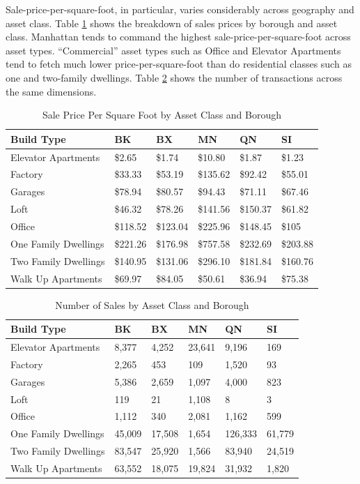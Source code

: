\documentclass[conference,final,]{IEEEtran}
\begin{document}
Sale-price-per-square-foot, in particular, varies considerably across
geography and asset class. Table \ref{tab:by_class_boro} shows the
breakdown of sales prices by borough and asset class. Manhattan tends to
command the highest sale-price-per-square-foot across asset types.
``Commercial'' asset types such as Office and Elevator Apartments tend
to fetch much lower price-per-square-foot than do residential classes
such as one and two-family dwellings. Table \ref{tab:by_class_boro_num}
shows the number of transactions across the same dimensions.

\begin{table}

\caption{\label{tab:by_class_boro}\label{tab:by_class_boro} Sale Price Per Square Foot by Asset Class and Borough}
\centering
\begin{tabular}[t]{l|l|l|l|l|l}
\hline
Build Type & BK & BX & MN & QN & SI\\
\hline
Elevator Apartments & \$2.65 & \$1.74 & \$10.80 & \$1.87 & \$1.23\\
\hline
Factory & \$33.33 & \$53.19 & \$135.62 & \$92.42 & \$55.01\\
\hline
Garages & \$78.94 & \$80.57 & \$94.43 & \$71.11 & \$67.46\\
\hline
Loft & \$46.32 & \$78.26 & \$141.56 & \$150.37 & \$61.82\\
\hline
Office & \$118.52 & \$123.04 & \$225.96 & \$148.45 & \$105\\
\hline
One Family Dwellings & \$221.26 & \$176.98 & \$757.58 & \$232.69 & \$203.88\\
\hline
Two Family Dwellings & \$140.95 & \$131.06 & \$296.10 & \$181.84 & \$160.76\\
\hline
Walk Up Apartments & \$69.97 & \$84.05 & \$50.61 & \$36.94 & \$75.38\\
\hline
\end{tabular}
\end{table}

\begin{table}

\caption{\label{tab:by_class_boro_num}\label{tab:by_class_boro_num} Number of Sales by Asset Class and Borough}
\centering
\begin{tabular}[t]{l|l|l|l|l|l}
\hline
Build Type & BK & BX & MN & QN & SI\\
\hline
Elevator Apartments & 8,377 & 4,252 & 23,641 & 9,196 & 169\\
\hline
Factory & 2,265 & 453 & 109 & 1,520 & 93\\
\hline
Garages & 5,386 & 2,659 & 1,097 & 4,000 & 823\\
\hline
Loft & 119 & 21 & 1,108 & 8 & 3\\
\hline
Office & 1,112 & 340 & 2,081 & 1,162 & 599\\
\hline
One Family Dwellings & 45,009 & 17,508 & 1,654 & 126,333 & 61,779\\
\hline
Two Family Dwellings & 83,547 & 25,920 & 1,566 & 83,940 & 24,519\\
\hline
Walk Up Apartments & 63,552 & 18,075 & 19,824 & 31,932 & 1,820\\
\hline
\end{tabular}
\end{table}
\end{document}
